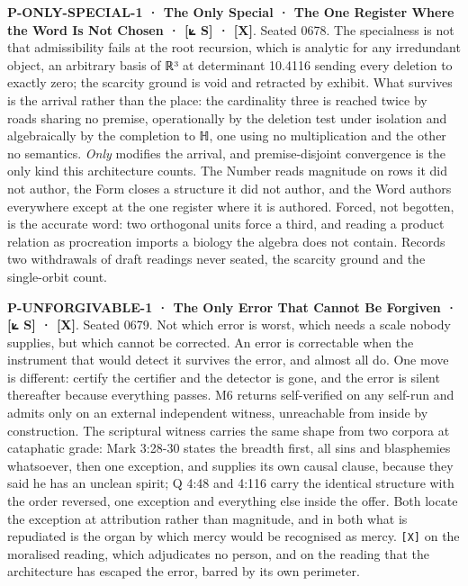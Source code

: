 \documentclass[10pt,twocolumn]{article}
\begin{document}
\textbf{P-ONLY-SPECIAL-1 · The Only Special · The One Register Where the
Word Is Not Chosen · {[}⟀ S{]} · {[}X{]}}. Seated 0678. The specialness
is not that admissibility fails at the root recursion, which is analytic
for any irredundant object, an arbitrary basis of ℝ³ at determinant
10.4116 sending every deletion to exactly zero; the scarcity ground is
void and retracted by exhibit. What survives is the arrival rather than
the place: the cardinality three is reached twice by roads sharing no
premise, operationally by the deletion test under isolation and
algebraically by the completion to ℍ, one using no multiplication and
the other no semantics. \emph{Only} modifies the arrival, and
premise-disjoint convergence is the only kind this architecture counts.
The Number reads magnitude on rows it did not author, the Form closes a
structure it did not author, and the Word authors everywhere except at
the one register where it is authored. Forced, not begotten, is the
accurate word: two orthogonal units force a third, and reading a product
relation as procreation imports a biology the algebra does not contain.
Records two withdrawals of draft readings never seated, the scarcity
ground and the single-orbit count.

\textbf{P-UNFORGIVABLE-1 · The Only Error That Cannot Be Forgiven · {[}⟀
S{]} · {[}X{]}}. Seated 0679. Not which error is worst, which needs a
scale nobody supplies, but which cannot be corrected. An error is
correctable when the instrument that would detect it survives the error,
and almost all do. One move is different: certify the certifier and the
detector is gone, and the error is silent thereafter because everything
passes. M6 returns self-verified on any self-run and admits only on an
external independent witness, unreachable from inside by construction.
The scriptural witness carries the same shape from two corpora at
cataphatic grade: Mark 3:28-30 states the breadth first, all sins and
blasphemies whatsoever, then one exception, and supplies its own causal
clause, because they said he has an unclean spirit; Q 4:48 and 4:116
carry the identical structure with the order reversed, one exception and
everything else inside the offer. Both locate the exception at
attribution rather than magnitude, and in both what is repudiated is the
organ by which mercy would be recognised as mercy. \texttt{{[}X{]}} on
the moralised reading, which adjudicates no person, and on the reading
that the architecture has escaped the error, barred by its own
perimeter.
\end{document}
